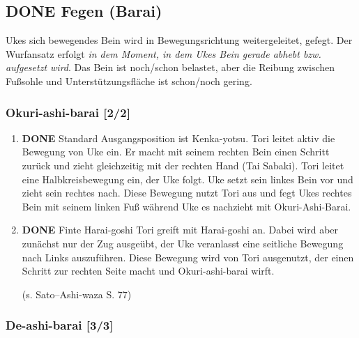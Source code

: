 \documentclass[11pt]{article}
\begin{document}
\subsection{{\bfseries\sffamily DONE} Fegen (Barai)}
\label{sec:orgda2a4aa}
Ukes sich bewegendes Bein wird in Bewegungsrichtung weitergeleitet, gefegt. 
Der Wurfansatz erfolgt \emph{in dem Moment, in dem Ukes Bein gerade abhebt bzw. aufgesetzt wird}. 
Das Bein ist noch/schon belastet, aber die Reibung zwischen Fußsohle und Unterstützungsfläche ist schon/noch gering.

\subsubsection{Okuri-ashi-barai [2/2]}
\label{sec:orga121678}

\begin{enumerate}
\item {\bfseries\sffamily DONE} Standard
\label{sec:org58f054c}
Ausgangsposition ist Kenka-yotsu. Tori leitet aktiv die Bewegung von Uke ein. Er macht mit seinem rechten Bein einen Schritt zurück und zieht gleichzeitig mit der rechten Hand (Tai Sabaki). Tori leitet eine Halbkreisbewegung ein, der Uke folgt. Uke setzt sein linkes Bein vor und zieht sein rechtes nach. Diese Bewegung nutzt Tori aus und fegt Ukes rechtes Bein mit seinem linken Fuß während Uke es nachzieht mit Okuri-Ashi-Barai.

\item {\bfseries\sffamily DONE} Finte Harai-goshi
\label{sec:org2e5fdda}
Tori greift mit Harai-goshi an. Dabei wird aber zunächst nur der Zug ausgeübt, der Uke veranlasst eine seitliche Bewegung nach Links auszuführen. 
Diese Bewegung wird von Tori ausgenutzt, der einen Schritt zur rechten Seite macht und Okuri-ashi-barai wirft.

(s. Sato--Ashi-waza S. 77)
\end{enumerate}

\subsubsection{De-ashi-barai [3/3]}
\label{sec:org91ed5cb}
\end{document}
